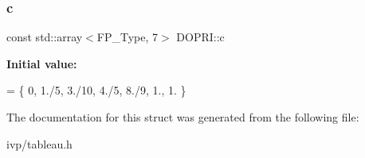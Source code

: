 \subsubsection{\texorpdfstring{c}{c}}
{\footnotesize\ttfamily const std\+::array$<$F\+P\+\_\+\+Type, 7$>$ D\+O\+P\+R\+I\+::c}

{\bfseries Initial value\+:}
\begin{DoxyCode}
= \{
    0, 1./5, 3./10, 4./5, 8./9, 1., 1.
  \}
\end{DoxyCode}


The documentation for this struct was generated from the following file\+:\begin{DoxyCompactItemize}
\item 
ivp/tableau.\+h\end{DoxyCompactItemize}
